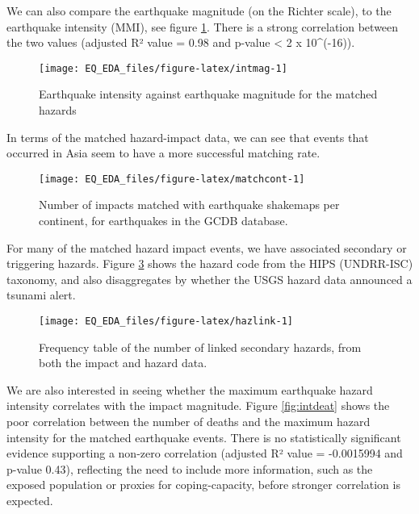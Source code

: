 \documentclass[
]{article}
\begin{document}
We can also compare the earthquake magnitude (on the Richter scale), to the earthquake intensity (MMI), see figure \ref{fig:intmag}. There is a strong correlation between the two values (adjusted R² value = 0.98 and p-value \textless{} 2 x 10\^{}(-16)).

\begin{figure}
\texttt{[image: EQ\_EDA\_files/figure-latex/intmag-1]} \caption[Earthquake intensity against earthquake magnitude for the matched hazards]{Earthquake intensity against earthquake magnitude for the matched hazards}\label{fig:intmag}
\end{figure}

In terms of the matched hazard-impact data, we can see that events that occurred in Asia seem to have a more successful matching rate.

\begin{figure}
\texttt{[image: EQ\_EDA\_files/figure-latex/matchcont-1]} \caption[Number of impacts matched with earthquake shakemaps per continent, for earthquakes in the GCDB database]{Number of impacts matched with earthquake shakemaps per continent, for earthquakes in the GCDB database.}\label{fig:matchcont}
\end{figure}

For many of the matched hazard impact events, we have associated secondary or triggering hazards. Figure \ref{fig:hazlink} shows the hazard code from the HIPS (UNDRR-ISC) taxonomy, and also disaggregates by whether the USGS hazard data announced a tsunami alert.

\begin{figure}
\texttt{[image: EQ\_EDA\_files/figure-latex/hazlink-1]} \caption[Frequency table of the number of linked secondary hazards, from both the impact and hazard data]{Frequency table of the number of linked secondary hazards, from both the impact and hazard data.}\label{fig:hazlink}
\end{figure}

We are also interested in seeing whether the maximum earthquake hazard intensity correlates with the impact magnitude. Figure \ref{fig:intdeat} shows the poor correlation between the number of deaths and the maximum hazard intensity for the matched earthquake events. There is no statistically significant evidence supporting a non-zero correlation (adjusted R² value = -0.0015994 and p-value 0.43), reflecting the need to include more information, such as the exposed population or proxies for coping-capacity, before stronger correlation is expected.
\end{document}
